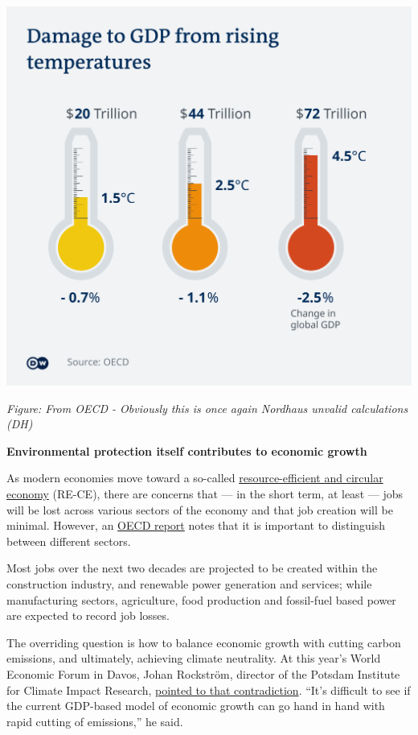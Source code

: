 \documentclass[
]{book}
\begin{document}
\includegraphics{fig/OECD_GDP_damage_from_temperature.png}

\emph{Figure: From OECD - Obviously this is once again Nordhaus unvalid calculations (DH)}

\textbf{Environmental protection itself contributes to economic growth}

As modern economies move toward a so-called
\href{https://www.oecd-ilibrary.org/docserver/c1f3c8d0-en.pdf}{resource-efficient and circular economy}
(RE-CE), there are concerns that --- in the short term, at least --- jobs will be lost across various sectors of the economy and that job creation will be minimal.
However, an \href{https://www.oecd-ilibrary.org/docserver/28e768df-en.pdf}{OECD report}
notes that it is important to distinguish between different sectors.

Most jobs over the next two decades are projected to be created within the construction industry, and renewable power generation and services; while manufacturing sectors, agriculture, food production and fossil-fuel based power are expected to record job losses.

The overriding question is how to balance economic growth with cutting carbon emissions, and ultimately, achieving climate neutrality. At this year's World Economic Forum in Davos, Johan Rockström, director of the Potsdam Institute for Climate Impact Research,
\href{https://www.nytimes.com/2020/01/21/climate/greta-thunberg-trump-davos.html}{pointed to that contradiction}. ``It's difficult to see if the current GDP-based model of economic growth can go hand in hand with rapid cutting of emissions,'' he said.
\end{document}
